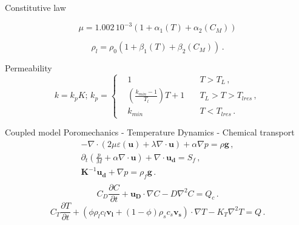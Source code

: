 \documentclass{beamer}
\begin{document}
\begin{frame}{Constitutive law}
\begin{block}{}
		\begin{equation*}
			\mu=1.002\, 10^{-3} \left( 1+ \alpha_1(T) +\alpha_2(C_M) \right)
		\end{equation*}
		 
		\begin{equation*}
			\rho_l =  \rho_0(1+\beta_1(T)+ \beta_2(C_M) )\, .
			\label{consrho}
		\end{equation*}%
\end{block}
{
\begin{block}{Permeability}
\begin{equation*}
k=k_pK; \, k_p=\left\{
\begin{aligned}
&1 \quad & T > T_L \,,\\
& \left( \frac{k_{min}-1}{T_l}\right)T +1 \quad & T_L> T > T_{lres}\,,\\
&k_{min}  \quad &  T < T_{lres}\,.
\end{aligned}
\right.
\end{equation*}
\end{block}
}
\end{frame}
\begin{frame}{Coupled model}
Poromechanics - Temperature Dynamics - Chemical transport
	\begin{equation*}
	 \begin{split}
	   	-\nabla \cdot \left(  2\mu\varepsilon (\mathbf{u}) + \lambda\nabla\cdot \mathbf{u}\right) + \alpha \nabla p=\rho\mathbf{g} \label{momentum}\, ,\\
 	\partial_t \left(\frac{p}{M} + \alpha \nabla \cdot \mathbf{u}\right)+ \nabla\cdot \mathbf{u_d}=S_f\,,\\ 
 	\mathbf{K}^{-1}\mathbf{u_d} + \nabla p = \rho_f\mathbf{g}\,.\\
	 \end{split}
	\end{equation*}
	\begin{equation*}
 	C_D\frac{\partial C}{\partial t} +
 	\mathbf{u_D} \cdot \nabla C- D\nabla^2 C 
 	= Q_c\,.
 	\end{equation*}
	\begin{equation*}
 	C_T\frac{\partial T}{\partial t} +
 	\left(  \phi\rho_l c_l \mathbf{v_l} 
 	+  (1 - \phi)\rho_s c_s \mathbf{v_s} \right)\cdot \nabla T- K_T \nabla^2 T 
 	= Q\,.
 	\end{equation*}
\end{frame}
\end{document}
